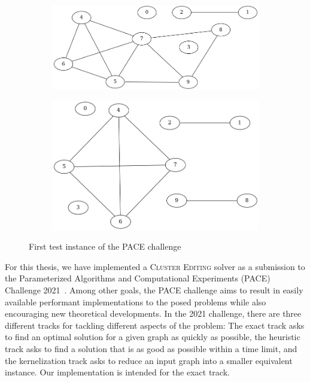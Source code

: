 \documentclass[12pt,oneside,english,parskip=full,headings=small]{scrbook}
\theoremstyle{definition}
\begin{document}
\begin{figure}[h]
	\centering

	\begin{subfigure}{0.49\textwidth}
		\includegraphics[width=1.0\linewidth]{exact001-input}
	\end{subfigure}
	\begin{subfigure}{0.49\textwidth}
		\includegraphics[width=1.0\linewidth]{exact001-output}
	\end{subfigure}

	\caption{First test instance of the PACE challenge}
	\label{fig:exact001}
\end{figure}

For this thesis, we have implemented a \textsc{Cluster Editing} solver as a submission to the
Parameterized Algorithms and Computational Experiments (PACE) Challenge 2021~\cite{Pace}. Among
other goals, the PACE challenge aims to result in easily available performant implementations to the
posed problems while also encouraging new theoretical developments. In the 2021 challenge, there are
three different tracks for tackling different aspects of the problem: The exact track asks to find
an optimal solution for a given graph as quickly as possible, the heuristic track asks to find a
solution that is as good as possible within a time limit, and the kernelization track asks to reduce
an input graph into a smaller equivalent instance. Our implementation is intended for the exact
track.
\end{document}
